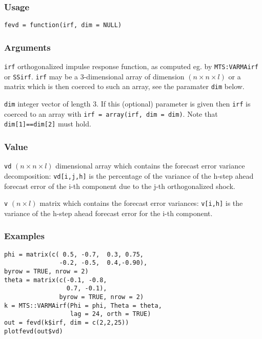 \documentclass[]{article}
\begin{document}
\subsubsection*{Usage}\begin{verbatim}
fevd = function(irf, dim = NULL)
\end{verbatim}\subsubsection*{Arguments}\begin{description}
\item \texttt{irf} orthogonalized impulse response function, as computed
              eg. by \texttt{MTS:VARMAirf} or \texttt{SSirf}.
              \newline
              \texttt{irf} may be a 3-dimensional array of dimension
              $(n\times n \times l)$ or a matrix which is then coerced 
              to such an array, see the paramater \texttt{dim} below.
\item \texttt{dim} integer vector of length 3. If this (optional) parameter 
           is given then \texttt{irf} is coerced to an array with 
           \texttt{irf = array(irf, dim = dim)}. Note that 
           \texttt{dim[1]==dim[2]} must hold.
\end{description}\subsubsection*{Value}\begin{description}
\item \texttt{vd} $(n\times n \times l)$ dimensional array which contains 
           the forecast error variance decomposition: 
           \texttt{vd[i,j,h]} is the percentage of the variance of the
           h-step ahead forecast error of the i-th component due to the j-th
           orthogonalized shock. 
\item \texttt{v} $(n \times l)$ matrix which contains the forecast error variances:
           \texttt{v[i,h]} is the variance of the h-step ahead forecast error 
           for the i-th component.

\end{description}\subsubsection*{Examples}\begin{verbatim}
phi = matrix(c( 0.5, -0.7,  0.3, 0.75,
               -0.2, -0.5,  0.4,-0.90),
byrow = TRUE, nrow = 2)
theta = matrix(c(-0.1, -0.8,
                 0.7, -0.1),
               byrow = TRUE, nrow = 2)
k = MTS::VARMAirf(Phi = phi, Theta = theta,
                  lag = 24, orth = TRUE)
out = fevd(k$irf, dim = c(2,2,25))
plotfevd(out$vd)
\end{verbatim}
\end{document}
